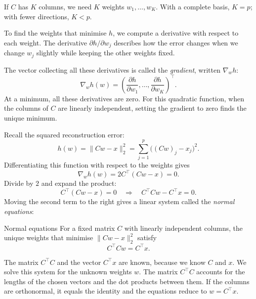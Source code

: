 \documentclass[a4paper,12pt,oneside]{report}
\begin{document}
If $C$ has $K$ columns, we need $K$ weights $w_1,\ldots,w_K$.
With a complete basis, $K=p$; with fewer directions, $K<p$.

To find the weights that minimise $h$, we compute a derivative with
respect to each weight. The derivative $\partial h/\partial w_j$
describes how the error changes when we change $w_j$ slightly while
keeping the other weights fixed.

The vector collecting all these derivatives is called the
\emph{gradient}, written $\nabla_w h$:
\[
  \nabla_w h(w)=
  \left(\frac{\partial h}{\partial w_1},\ldots,
        \frac{\partial h}{\partial w_K}\right)^\top.
\]
At a minimum, all these derivatives are zero. For this quadratic
function, when the columns of $C$ are linearly independent, setting
the gradient to zero finds the unique minimum.

Recall the squared reconstruction error:
\[
  h(w)=\lVert Cw-x\rVert_2^2
      =\sum_{j=1}^{p}\bigl((Cw)_j-x_j\bigr)^2.
\]
Differentiating this function with respect to the weights gives
\[
  \nabla_w h(w)=2C^\top(Cw-x)=0.
\]
Divide by $2$ and expand the product:
\[
  C^\top(Cw-x)=0
  \quad\Longrightarrow\quad
  C^\top Cw-C^\top x=0.
\]
Moving the second term to the right gives a linear system called the
\emph{normal equations}:
\begin{framedprop}{Normal equations}\label{prop:normal-equations}
For a fixed matrix $C$ with linearly independent columns, the unique
weights that minimise $\lVert Cw-x\rVert_2^2$ satisfy
\[
  \boxed{C^\top Cw=C^\top x.}
\]
\end{framedprop}
The matrix $C^\top C$ and the vector $C^\top x$ are known, because we
know $C$ and $x$. We solve this system for the unknown weights $w$.
The matrix $C^\top C$ accounts for the lengths of the chosen vectors
and the dot products between them. If the columns are orthonormal,
it equals the identity and the equations reduce to $w=C^\top x$.
\end{document}
